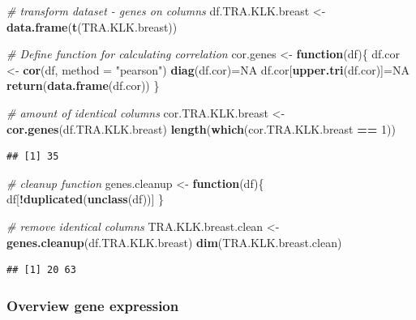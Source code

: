 \documentclass[
]{article}
\newenvironment{Shaded}{\begin{snugshade}}{\end{snugshade}}
\newcommand{\CommentTok}[1]{\textcolor[rgb]{0.56,0.35,0.01}{\textit{#1}}}
\newcommand{\ControlFlowTok}[1]{\textcolor[rgb]{0.13,0.29,0.53}{\textbf{#1}}}
\newcommand{\DataTypeTok}[1]{\textcolor[rgb]{0.13,0.29,0.53}{#1}}
\newcommand{\DecValTok}[1]{\textcolor[rgb]{0.00,0.00,0.81}{#1}}
\newcommand{\KeywordTok}[1]{\textcolor[rgb]{0.13,0.29,0.53}{\textbf{#1}}}
\newcommand{\NormalTok}[1]{#1}
\newcommand{\OperatorTok}[1]{\textcolor[rgb]{0.81,0.36,0.00}{\textbf{#1}}}
\newcommand{\OtherTok}[1]{\textcolor[rgb]{0.56,0.35,0.01}{#1}}
\newcommand{\StringTok}[1]{\textcolor[rgb]{0.31,0.60,0.02}{#1}}
\begin{document}
\begin{Shaded}
\begin{Highlighting}[]
\CommentTok{# transform dataset - genes on columns}
\NormalTok{df.TRA.KLK.breast <-}\StringTok{ }\KeywordTok{data.frame}\NormalTok{(}\KeywordTok{t}\NormalTok{(TRA.KLK.breast))}

\CommentTok{# Define function for calculating correlation }
\NormalTok{cor.genes <-}\StringTok{ }\ControlFlowTok{function}\NormalTok{(df)\{}
\NormalTok{  df.cor <-}\StringTok{ }\KeywordTok{cor}\NormalTok{(df, }\DataTypeTok{method =} \StringTok{"pearson"}\NormalTok{)}
  \KeywordTok{diag}\NormalTok{(df.cor)=}\OtherTok{NA}
\NormalTok{  df.cor[}\KeywordTok{upper.tri}\NormalTok{(df.cor)]=}\OtherTok{NA}
  \KeywordTok{return}\NormalTok{(}\KeywordTok{data.frame}\NormalTok{(df.cor))}
\NormalTok{\}}

\CommentTok{# amount of identical columns}
\NormalTok{cor.TRA.KLK.breast <-}\StringTok{ }\KeywordTok{cor.genes}\NormalTok{(df.TRA.KLK.breast)}
\KeywordTok{length}\NormalTok{(}\KeywordTok{which}\NormalTok{(cor.TRA.KLK.breast }\OperatorTok{==}\StringTok{ }\DecValTok{1}\NormalTok{))}
\end{Highlighting}
\end{Shaded}

\begin{verbatim}
## [1] 35
\end{verbatim}

\begin{Shaded}
\begin{Highlighting}[]
\CommentTok{# cleanup function }
\NormalTok{genes.cleanup <-}\StringTok{ }\ControlFlowTok{function}\NormalTok{(df)\{}
\NormalTok{  df[}\OperatorTok{!}\KeywordTok{duplicated}\NormalTok{(}\KeywordTok{unclass}\NormalTok{(df))]}
\NormalTok{\}}

\CommentTok{# remove identical columns}
\NormalTok{TRA.KLK.breast.clean <-}\StringTok{ }\KeywordTok{genes.cleanup}\NormalTok{(df.TRA.KLK.breast)}
\KeywordTok{dim}\NormalTok{(TRA.KLK.breast.clean)}
\end{Highlighting}
\end{Shaded}

\begin{verbatim}
## [1] 20 63
\end{verbatim}

\hypertarget{overview-gene-expression}{%
\subsubsection{Overview gene
expression}\label{overview-gene-expression}}
\end{document}

